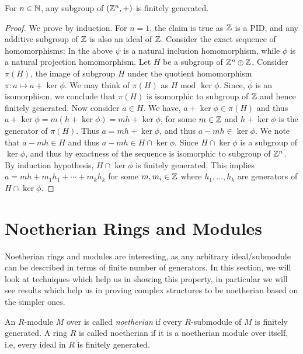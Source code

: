 \documentclass[11pt]{article}
\begin{document}
\begin{lemma}\label{lem:zn-noetherian}
For $n\in \mathbb{N}$, any subgroup of $(\mathbb{Z}^n,+)$ is finitely generated.
\end{lemma}
\begin{proof}
We prove by induction. For $n=1$, the claim is true as $\mathbb{Z}$ is a PID, and any additive subgroup of $\mathbb{Z}$ is
also an ideal of $\mathbb{Z}$. Consider the exact sequence of homomorphisms:
In the above $\psi$ is a natural inclusion homomorphism, while $\phi$ is a natural projection homomorphism. Let
$H$ be a subgroup of $\mathbb{Z}^n\oplus \mathbb{Z}$. Consider $\pi(H)$, the image of subgroup $H$ under the quotient homomorphism
$\pi: a \mapsto a + \ker{\phi}$. We may think of $\pi(H)$ as $H \textrm{ mod } \ker{\phi}$. Since, $\bar{\phi}$
is an isomorphism, we conclude that $\pi(H)$ is isomorphic to subgroup of $\mathbb{Z}$ and hence finitely generated.
Now consider $a\in H$. We have,
$a+\ker{\phi}\in \pi(H)$ and thus $a+\ker{\phi} = m(h+\ker{\phi})= mh+\ker{\phi}$, for some $m\in \mathbb{Z}$ and
$h+\ker{\phi}$ is the generator of $\pi(H)$. Thus $a=mh + \ker{\phi}$, and thus $a-mh\in \ker{\phi}$. We note
that $a-mh\in H$ and thus $a-mh\in H\cap \ker{\phi}$. Since $H\cap \ker{\phi}$ is a subgroup of $\ker{\phi}$,
and thus by exactness of the sequence is isomorphic to subgroup of $\mathbb{Z}^n$. By induction hypothesis,
$H\cap \ker{\phi}$ is finitely generated. This implies $a=mh + m_1 h_1 + \cdots + m_k h_k$ for some $m,m_i\in \mathbb{Z}$
where $h_1,\ldots,h_k$ are generators of $H\cap \ker{\phi}$.
\end{proof}

\section{Noetherian Rings and Modules}\label{sec:noetherian-rings-modules}
Noetherian rings and modules are interesting, as any arbitrary ideal/submodule can be described in terms of
finite number of generators. In this section, we will look at techniques which help us in showing this property,
in particular we will see results which help us in proving complex structures to be noetherian based on the
simpler ones.

\begin{definition}\label{defn:noetherian}
An $R$-module $M$ over is called {\em noetherian} if every $R$-submodule of $M$ is finitely generated. A ring
$R$ is called noetherian if it is a noetherian module over itself, i.e, every ideal in $R$ is finitely generated.
\end{definition}
\end{document}
